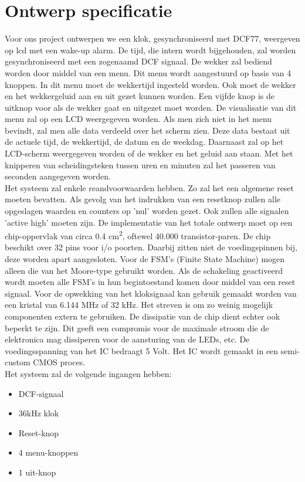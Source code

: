 \chapter{Ontwerp specificatie}
Voor ons project ontwerpen we een klok, gesynchroniseerd met DCF77, weergeven op lcd met een wake-up alarm. De tijd, die intern wordt bijgehouden, zal worden gesynchroniseerd met een zogenaamd DCF signaal. De wekker zal bediend worden door middel van een menu. Dit menu wordt aangestuurd op basis van 4 knoppen. In dit menu moet de wekkertijd ingesteld worden. Ook moet de wekker en het wekkergeluid aan en uit gezet kunnen worden. Een vijfde knop is de uitknop voor als de wekker gaat en uitgezet moet worden. De visualisatie van dit menu zal op een LCD weergegeven worden. Als men zich niet in het menu bevindt, zal men alle data verdeeld over het scherm zien. Deze data bestaat uit de actuele tijd, de wekkertijd, de datum en de weekdag. Daarnaast zal op het LCD-scherm weergegeven worden of de wekker en het geluid aan staan. Met het knipperen van scheidingsteken tussen uren en minuten zal het passeren van seconden aangegeven worden.\\

Het systeem zal enkele reandvoorwaarden hebben. Zo zal het een algemene reset moeten bevatten. Als gevolg van het indrukken van een resetknop zullen alle opgeslagen waarden en counters op 'nul' worden gezet. Ook zullen alle signalen 'active high' moeten zijn. De implementatie van het totale ontwerp moet op een chip-oppervlak van circa 0.4 cm\textsuperscript{2}, oftewel 40.000 transistor-paren. De chip beschikt over 32 pins voor i/o poorten. Daarbij zitten niet de voedingspinnen bij, deze worden apart aangesloten. Voor de FSM’s (Finite State Machine) mogen alleen die van het Moore-type gebruikt worden. Als de schakeling geactiveerd wordt moeten alle FSM’s in hun begintoestand komen door middel van een reset signaal. Voor de opwekking van het kloksignaal kan gebruik gemaakt worden van een kristal van 6.144 MHz of 32 kHz. Het streven is om zo weinig mogelijk componenten extern te gebruiken. De dissipatie van de chip dient echter ook beperkt te zijn. Dit geeft een compromis voor de maximale stroom die de elektronica mag dissiperen voor de aansturing van de LEDs, etc. De voedingsspanning van het IC bedraagt 5 Volt. Het IC wordt gemaakt in een semi-custom CMOS proces. \\

Het systeem zal de volgende ingangen hebben:
\begin{itemize}[nolistsep]
\item	DCF-signaal
\item	36kHz klok
\item	Reset-knop
\item	4 menu-knoppen
\item  1 uit-knop
\end{itemize}

